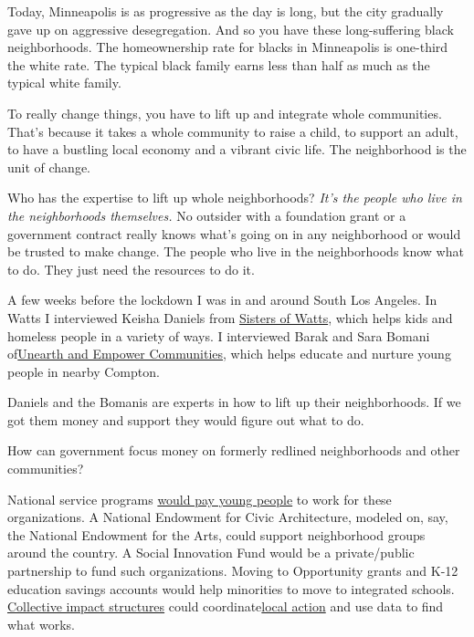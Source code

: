 Today, Minneapolis is as progressive as the day is long, but the city
gradually gave up on aggressive desegregation. And so you have these
long-suffering black neighborhoods. The homeownership rate for blacks in
Minneapolis is one-third the white rate. The typical black family earns
less than half as much as the typical white family.

To really change things, you have to lift up and integrate whole
communities. That's because it takes a whole community to raise a child,
to support an adult, to have a bustling local economy and a vibrant
civic life. The neighborhood is the unit of change.

Who has the expertise to lift up whole neighborhoods? \emph{It's the
people who live in the neighborhoods themselves.} No outsider with a
foundation grant or a government contract really knows what's going on
in any neighborhood or would be trusted to make change. The people who
live in the neighborhoods know what to do. They just need the resources
to do it.

A few weeks before the lockdown I was in and around South Los Angeles.
In Watts I interviewed Keisha Daniels from
\href{https://sistersofwatts.org/}{Sisters of Watts}, which helps kids
and homeless people in a variety of ways. I interviewed Barak and Sara
Bomani of\href{https://www.unearthandempower.org/}{Unearth and Empower
Communities}, which helps educate and nurture young people in nearby
Compton.

Daniels and the Bomanis are experts in how to lift up their
neighborhoods. If we got them money and support they would figure out
what to do.

How can government focus money on formerly redlined neighborhoods and
other communities?

National service programs
\href{https://www.nytimes3xbfgragh.onion/2020/05/07/opinion/national-service-americorps-coronavirus.html}{would
pay young people} to work for these organizations. A National Endowment
for Civic Architecture, modeled on, say, the National Endowment for the
Arts, could support neighborhood groups around the country. A Social
Innovation Fund would be a private/public partnership to fund such
organizations. Moving to Opportunity grants and K-12 education savings
accounts would help minorities to move to integrated schools.
\href{https://www.nytimes3xbfgragh.onion/2018/10/08/opinion/collective-impact-community-civic-architecture.html}{Collective
impact structures} could
coordinate\href{https://www.nytimes3xbfgragh.onion/2019/04/04/opinion/canada-poverty-record.html}{local
action} and use data to find what works.

